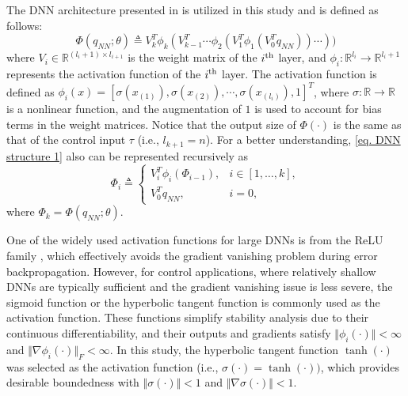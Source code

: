 \documentclass[lettersize,journal]{IEEEtran}
\begin{document}
The DNN architecture presented in \cite{RN16} is utilized in this study and is defined as follows:
\begin{equation}
    \Phi(q_{NN};\theta) \triangleq V_k^T  \phi_{k}(V_{k-1}^T   \cdots \phi_2(V_1^T   \phi_1(V_0^T   q_{NN}))\cdots ))
    \label{eq. DNN structure 1}
\end{equation}
where $V_i\in\mathbb{R}^{(l_i+1)\times l_{i+1}}$ is the weight matrix of the $i\textsuperscript{th}$ layer, and $\phi_i: \mathbb{R}^{l_i}\to\mathbb{R}^{l_i+1}$ represents the activation function of the $i\textsuperscript{th}$ layer. The activation function is defined as $\phi_i(x)=[\sigma(x_{(1)}),\sigma(x_{(2)}),\cdots, \sigma(x_{(l_{i})}), 1]^T$, where $\sigma: \mathbb{R}\to\mathbb{R}$ is a nonlinear function, and the augmentation of $1$ is used to account for bias terms in the weight matrices. Notice that the output size of $\Phi(\cdot)$ is the same as that of the control input $\tau$ (i.e., $l_{k+1}=n$). For a better understanding, \eqref{eq. DNN structure 1} also can be represented recursively as 
\begin{equation*}
    \Phi_i \triangleq
    \begin{cases}
        V_i^T  \phi_i(\Phi_{i-1}), &i\in[1,\dots,k],\\
        V_0^T  q_{NN},&i=0,
    \end{cases}
    \label{eq. DNN structure 2}
\end{equation*}
where $\Phi_k = \Phi(q_{NN};\theta)$.

One of the widely used activation functions for large DNNs is from the ReLU family \cite{RN27}, which effectively avoids the gradient vanishing problem during error backpropagation. However, for control applications, where relatively shallow DNNs are typically sufficient and the gradient vanishing issue is less severe, the sigmoid function or the hyperbolic tangent function is commonly used as the activation function. These functions simplify stability analysis due to their continuous differentiability, and their outputs and gradients satisfy $\Vert \phi_i(\cdot)\Vert < \infty$ and  $\Vert \nabla\phi_i(\cdot)\Vert_F < \infty$. In this study, the hyperbolic tangent function $\tanh(\cdot)$ was selected as the activation function (i.e., $\sigma(\cdot) = \tanh(\cdot))$, which provides desirable boundedness with $\Vert\sigma(\cdot)\Vert<1$ and $\Vert\nabla\sigma(\cdot)\Vert< 1$.
\end{document}
